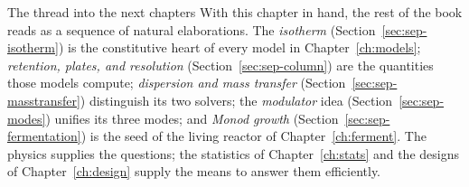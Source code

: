 \begin{keybox}{The thread into the next chapters}
With this chapter in hand, the rest of the book reads as a sequence of natural
elaborations. The \emph{isotherm} (Section~\ref{sec:sep-isotherm}) is the
constitutive heart of every model in Chapter~\ref{ch:models}; \emph{retention,
plates, and resolution} (Section~\ref{sec:sep-column}) are the quantities those
models compute; \emph{dispersion and mass transfer}
(Section~\ref{sec:sep-masstransfer}) distinguish its two solvers; the
\emph{modulator} idea (Section~\ref{sec:sep-modes}) unifies its three modes; and
\emph{Monod growth} (Section~\ref{sec:sep-fermentation}) is the seed of the
living reactor of Chapter~\ref{ch:ferment}. The physics supplies the questions;
the statistics of Chapter~\ref{ch:stats} and the designs of
Chapter~\ref{ch:design} supply the means to answer them efficiently.
\end{keybox}
